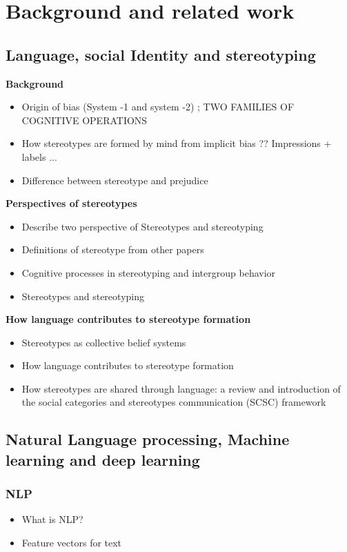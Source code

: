 \chapter{Background and related work}

\section{Language, social Identity and stereotyping}

\textbf{Background}
\begin{itemize}
    \item Origin of bias (System -1 and system -2) ; TWO FAMILIES OF COGNITIVE OPERATIONS \cite{kahneman2002representativeness}
    \item  How stereotypes are formed by mind from implicit bias  ??
    Impressions + labels ...
    \cite{fiske1998stereotyping}
    \item Difference between stereotype and prejudice \cite{fiske1998stereotyping}
\end{itemize}
\textbf{Perspectives of stereotypes}
\begin{itemize}
    \item Describe two perspective of Stereotypes and stereotyping 
    \item Definitions of stereotype from other papers
    \item Cognitive processes in stereotyping and intergroup behavior \cite{hamilton2015cognitive}
    \item Stereotypes and stereotyping \cite{macrae1996stereotypes}
\end{itemize}
\textbf{How language contributes to stereotype formation}
    \begin{itemize}
        \item Stereotypes as collective belief systems \cite{macrae1996stereotypes}
        \item How language contributes to stereotype formation \cite{burgers2020language}
        \item How stereotypes are shared through language: a
    review and introduction of the social categories
    and stereotypes communication (SCSC) framework \cite{beukeboom2019stereotypes}
    \end{itemize}
\section{Natural Language processing, Machine learning and deep learning}
\subsection{NLP}
    \begin{itemize}
        \item What is NLP?
        \item Feature vectors for text 
    \end{itemize}

